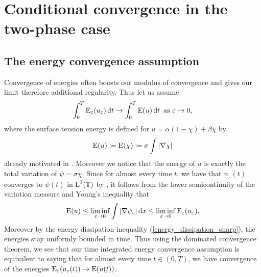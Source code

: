 \section{Conditional convergence in the two-phase case}

\subsection{The energy convergence assumption}

Convergence of energies often boosts our 
modulus of convergence and gives our limit therefore additional regularity. 
Thus let us assume 
\begin{equation}
	\label{energy_convergence}
	\int_{ 0 }^{ T }
	\operatorname{E}_{ \varepsilon } ( u_{ \varepsilon } ) 
	\dd{ t }
	\to 
	\int_{ 0 }^{ T }
	\operatorname{E} ( u )
	\dd{ t }
	\text{ as }
	\varepsilon \to 0,
\end{equation}
where the surface tension energy is defined for $ u = \alpha ( 1 - \chi ) + 
\beta \chi $ by 
\begin{equation}
	\operatorname{E} ( u ) 
	\coloneqq
	\operatorname{E} ( \chi )
	\coloneqq
	\sigma \int \abs{ \nabla \chi }
\end{equation}
already motivated in .
Moreover we notice that the energy of $ u $ is exactly the total variation of $ 
\psi = \sigma \chi $.
Since for almost every time $ t $, we have that $ \psi_{ \varepsilon } ( t ) $ 
converges to $ \psi ( t ) $ in $ \operatorname{L}^{ 1 }  ( \operatorname{\mathbb{T}} ) $ by 
, it follows from the lower semicontinuity of 
the variation measure and Young's inequality that
\begin{equation*}
	\operatorname{E} ( u ) 
	\leq
	\liminf_{ \varepsilon \to 0 }
	\int
	\abs{ \nabla \psi_{ \varepsilon } }
	\dd{ x }
	\leq
	\liminf_{ \varepsilon \to 0 }
	\operatorname{E}_{ \varepsilon } ( u_{ \varepsilon } ).
\end{equation*}
Moreover by the energy dissipation inequality (\ref{energy_dissipation_sharp}), 
the energies stay uniformly bounded in time. Thus using the dominated 
convergence theorem, we see that our time integrated energy convergence 
assumption is equivalent to saying that for almost every time $ t \in ( 0, T ) 
$, we have convergence of the energies $ \operatorname{E}_{ \varepsilon } ( u_{ 
\varepsilon } ( t ) ) \to \operatorname{E} ( u ( t ) ) $.

